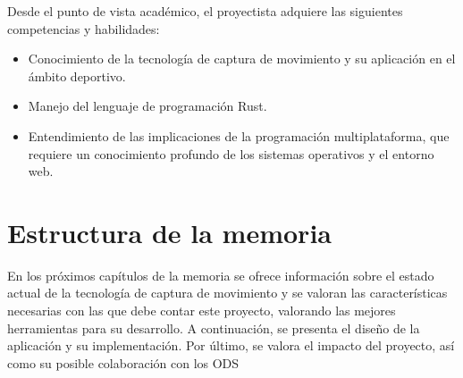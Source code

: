 Desde el punto de vista académico, el proyectista adquiere las siguientes competencias y habilidades:

\begin{itemize}
    \item Conocimiento de la tecnología de captura de movimiento y su aplicación en el ámbito deportivo.
    \item Manejo del lenguaje de programación Rust.
    \item Entendimiento de las implicaciones de la programación multiplataforma, que requiere un conocimiento profundo de los sistemas operativos y el entorno web.
\end{itemize}

\section{Estructura de la memoria}

En los próximos capítulos de la memoria se ofrece información sobre el estado actual de la tecnología de captura de movimiento y se valoran las características necesarias con las que debe contar este proyecto, valorando las mejores herramientas para su desarrollo. A continuación, se presenta el diseño de la aplicación y su implementación. Por último, se valora el impacto del proyecto, así como su posible colaboración con los \ac{ODS}